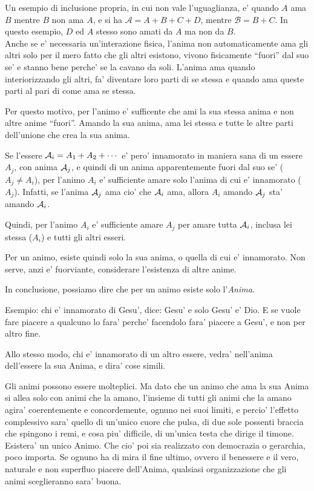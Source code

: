 Un esempio di inclusione propria, in cui non vale l'uguaglianza, e' quando $A$ ama $B$ mentre $B$ non ama $A$, e si ha $\mathcal{A}=A+B+C+D$, mentre $\mathcal{B}=B+C$. In questo esempio, $D$ ed $A$ stesso sono amati da $A$ ma non da $B$.\\

Anche se e' necessaria un'interazione fisica, l'anima non automaticamente ama gli altri solo per il mero fatto che gli altri esistono, vivono fisicamente ``fuori'' dal suo se' e stanno bene perche' se la cavano da soli. L'anima ama quando interiorizzando gli altri, fa' diventare loro parti di se stessa e quando ama queste parti al pari di come ama se stessa.

Per questo motivo, per l'animo e' sufficente che ami la sua stessa anima e non altre anime ``fuori''. Amando la sua anima, ama lei stessa e tutte le altre parti dell'unione che crea la sua anima.

Se l'essere $\mathcal{A}_i=A_1+A_2+\cdots$ e' pero' innamorato in maniera sana di un essere $A_j$, con anima $\mathcal{A}_j$, e quindi di un anima apparentemente fuori dal suo se' ($A_j\ne A_i$), per l'animo $A_i$ e' sufficiente amare solo l'anima di cui e' innamorato ($A_j$). Infatti, se l'anima $\mathcal{A}_j$ ama cio' che $\mathcal{A}_i$ ama, allora $A_i$ amando $\mathcal{A}_j$ sta' amando $\mathcal{A}_i$.

Quindi, per l'animo $A_i$ e' sufficiente amare $A_j$ per amare tutta $\mathcal{A}_i$, inclusa lei stessa ($A_i$) e tutti gli altri esseri.

Per un animo, esiste quindi solo la sua anima, o quella di cui e' innamorato. Non serve, anzi e' fuorviante, considerare l'esistenza di altre anime.

In conclusione, possiamo dire che per un animo esiste solo l'\emph{Anima}.

Esempio: chi e' innamorato di Gesu', dice: Gesu' e solo Gesu' e' Dio. E se vuole fare piacere a qualcuno lo fara' perche' facendolo fara' piacere a Gesu', e non per altro fine. 

Allo stesso modo, chi e' innamorato di un altro essere, vedra' nell'anima dell'essere la sua Anima, e dira' cose simili.

Gli animi possono essere molteplici. Ma dato che un animo che ama la sua Anima si allea solo con animi che la amano, l'insieme di tutti gli animi che la amano agira' coerentemente e concordemente, ognuno nei suoi limiti, e percio' l'effetto complessivo sara' quello di un'unico cuore che pulsa, di due sole possenti braccia che spingono i remi, e cosa piu' difficile, di un'unica testa che dirige il timone. Esistera' un unico Animo. Che cio' poi sia realizzato con democrazia o gerarchia, poco importa. Se ognuno ha di mira il fine ultimo, ovvero il benessere e il vero, naturale e non superfluo piacere dell'Anima, qualsiasi organizzazione che gli animi sceglieranno sara' buona.

